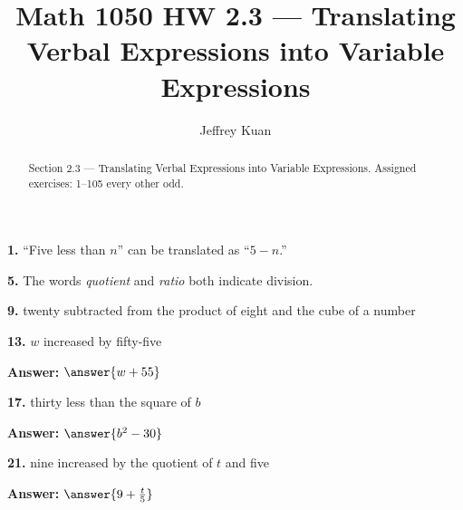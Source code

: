 \documentclass{ximera}
\author{Jeffrey Kuan}
\title{Math 1050 HW 2.3 --- Translating Verbal Expressions into Variable Expressions}
\begin{document}
\begin{abstract}
    Section 2.3 --- Translating Verbal Expressions into Variable Expressions.
    Assigned exercises: 1–105 every other odd.
\end{abstract}

\maketitle

\begin{problem}
\textbf{1.} ``Five less than $n$'' can be translated as ``$5 - n$.''

\begin{multipleChoice}
\end{multipleChoice}
\end{problem}

\begin{problem}
\textbf{5.} The words \emph{quotient} and \emph{ratio} both indicate division.

\begin{multipleChoice}
\end{multipleChoice}
\end{problem}

\begin{problem}
\textbf{9.} twenty subtracted from the product of eight and the cube of a number

\begin{multipleChoice}
\end{multipleChoice}
\end{problem}

\begin{problem}
\textbf{13.} $w$ increased by fifty-five

\textbf{Answer:} $\answer{w+55}$
\end{problem}

\begin{problem}
\textbf{17.} thirty less than the square of $b$

\textbf{Answer:} $\answer{b^2-30}$
\end{problem}

\begin{problem}
\textbf{21.} nine increased by the quotient of $t$ and five

\textbf{Answer:} $\answer{9+\frac{t}{5}}$
\end{problem}
\end{document}
